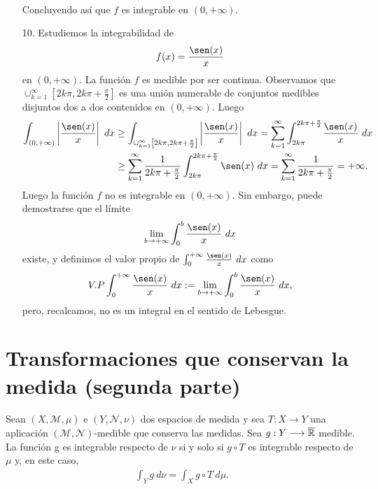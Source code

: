 \begin{ejemplo}
\begin{enumerate}
\begin{align*}
              \end{align*}
              Concluyendo así que $f$ es integrable en $(0,+\infty)$.
        \item[10.] Estudiemos la integrabilidad de
              \begin{align*}
                  f(x) = \frac{\sen(x)}{x}
              \end{align*}
              en $(0,+\infty)$. La función $f$ es medible por ser continua. Observamos que $\cup_{k=1}^{\infty}{\left[2k\pi, 2k\pi + \frac{\pi}{2}\right]}$ es una unión numerable de conjuntos medibles disjuntos dos a dos contenidos en $(0,+\infty)$. Luego
              \begin{align*}
                  \int_{(0,+\infty)}{\left| \frac{\sen(x)}{x}\right| \ dx} & \ge \int_{\cup_{k=1}^{\infty}{\left[2k\pi, 2k\pi + \frac{\pi}{2}\right]}}{\left| \frac{\sen(x)}{x}\right| \ dx} = \sum_{k=1}^{\infty}{\int_{2k\pi}^{2k\pi + \frac{\pi}{2}}}{\frac{\sen(x)}{x} \ dx} \\
                                                                           & \ge \sum_{k=1}^{\infty}{\frac{1}{2k\pi + \frac{\pi}{2}}\int_{2k\pi}^{2k\pi + \frac{\pi}{2}}{\sen(x) \ dx}} = \sum_{k=1}^{\infty}{\frac{1}{2k\pi + \frac{\pi}{2}}} = +\infty.
              \end{align*}
              Luego la función $f$ no es integrable en $(0,+\infty)$. Sin embargo, puede demostrarse que el límite
              \begin{align*}
                  \lim_{b \to +\infty}{\int_{0}^{b}{\frac{\sen(x)}{x}} \ dx}
              \end{align*}
              existe, y definimos el valor propio de $\int_{0}^{+\infty}{\frac{\sen(x)}{x} \ dx}$ como
              \begin{align*}
                  V.P\int_{0}^{+\infty}{\frac{\sen(x)}{x} \ dx} := \lim_{b \to +\infty}{\int_{0}^{b}{\frac{\sen(x)}{x}} \ dx},
              \end{align*}
              pero, recalcamos, no es un integral en el sentido de Lebesgue.
    \end{enumerate}
\end{ejemplo}

\section{Transformaciones que conservan la medida (segunda parte)}

\begin{teo}
    Sean $(X, \mathcal{M}, \mu)$ e $(Y, \mathcal{N},\nu)$ dos espacios de medida y sea $T: X \longrightarrow Y$ una aplicación $(\mathcal{M},\mathcal{N})$-medible que conserva las medidas. Sea $g: Y \longrightarrow \overline{\mathbb{R}}$ medible. La función g es integrable respecto de $\nu$ si y solo si $g \circ T$ es integrable respecto de $\mu$ y, en este caso,
    \begin{align*}
        \int_{Y}{g \ d\nu} = \int_{X}{g \circ T \ d\mu}.
    \end{align*}
\end{teo}

